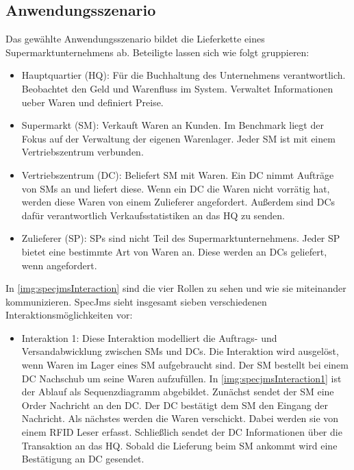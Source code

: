 \subsection{Anwendungsszenario}
Das gewählte Anwendungsszenario bildet die Lieferkette eines Supermarktunternehmens ab. Beteiligte lassen sich wie folgt gruppieren: 
\begin{itemize}
    \item Hauptquartier (HQ): Für die Buchhaltung des Unternehmens verantwortlich. Beobachtet den Geld und Warenfluss im System. Verwaltet Informationen ueber Waren und definiert Preise.
    \item Supermarkt (SM): Verkauft Waren an Kunden. Im Benchmark liegt der Fokus auf der Verwaltung der eigenen Warenlager. Jeder SM ist mit einem Vertriebszentrum verbunden.
    \item Vertriebszentrum (DC): Beliefert SM mit Waren. Ein DC nimmt Aufträge von SMs an und liefert diese. Wenn ein DC die Waren nicht vorrätig hat, werden diese Waren von einem Zulieferer angefordert. Außerdem sind DCs dafür verantwortlich Verkaufsstatistiken an das HQ zu senden.
    \item Zulieferer (SP): SPs sind nicht Teil des Supermarktunternehmens. Jeder SP bietet eine bestimmte Art von Waren an. Diese werden an DCs geliefert, wenn angefordert.
\end{itemize}
In \autoref{img:specjmsInteraction} sind die vier Rollen zu sehen und wie sie miteinander kommunizieren. SpecJms sieht insgesamt sieben verschiedenen Interaktionsmöglichkeiten vor: 
\begin{itemize}
    \item Interaktion 1: Diese Interaktion modelliert die Auftrags- und Versandabwicklung zwischen SMs und DCs. Die Interaktion wird ausgelöst, wenn Waren im Lager eines SM aufgebraucht sind. Der SM bestellt bei einem DC Nachschub um seine Waren aufzufüllen. In \autoref{img:specjmsInteraction1} ist der Ablauf als Sequenzdiagramm abgebildet. Zunächst sendet der SM eine Order Nachricht an den DC. Der DC bestätigt dem SM den Eingang der Nachricht. Als nächstes werden die Waren verschickt. Dabei werden sie von einem RFID Leser erfasst. Schließlich sendet der DC Informationen über die Transaktion an das HQ. Sobald die Lieferung beim SM ankommt wird eine Bestätigung an DC gesendet.
\end{itemize}

